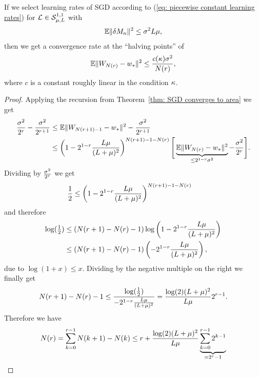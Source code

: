 \begin{theorem}
	If we select learning rates of SGD according to (\ref{eq: piecewise constant
	learning rates}) for \(\mathcal{L}\in\mathcal{S}^{1,1}_{{\mu},{L}}\) with
	\begin{align*}
		\mathbb{E}\|\delta M_n\|^2\le \sigma^2L\mu,
	\end{align*}
	then we get a convergence rate at the ``halving points'' of
	\begin{align*}
		\mathbb{E}\|W_{N(r)} - w_*\|^2 \le \frac{c(\kappa)\sigma^2}{N(r)},
	\end{align*}
	where \(c\) is a constant roughly linear in the condition \(\kappa\).
\end{theorem}
\begin{proof}
	Applying the recursion from Theorem~\ref{thm: SGD converges to area} we get
	\begin{align*}
		\frac{\sigma^2}{2^r} - \frac{\sigma^2}{2^{r+1}}
		&\le\mathbb{E}\|W_{N(r+1)-1} - w_*\|^2 - \frac{\sigma^2}{2^{r+1}}\\
		&\le \left(1-2^{1-r}\frac{L\mu}{(L+\mu)^2}\right)^{N(r+1)-1-N(r)}
		\Bigg[
			\underbrace{\mathbb{E}\|W_{N(r)}-w_*\|^2}_{\le 2^{1-r}\sigma^2} - \frac{\sigma^2}{2^r}
		\Bigg].
	\end{align*}
	Dividing by \(\tfrac{\sigma^2}{2^r}\) we get
	\begin{align*}
		\frac{1}{2}
		&\le \left(1-2^{1-r}\frac{L\mu}{(L+\mu)^2}\right)^{N(r+1)-1-N(r)}
	\end{align*}
	and therefore
	\begin{align*}
		\log(\tfrac12)
		&\le (N(r+1)-N(r)-1)\log\left(1-2^{1-r}\frac{L\mu}{(L+\mu)^2}\right)\\
		&\le (N(r+1)-N(r)-1)\left(-2^{1-r}\frac{L\mu}{(L+\mu)^2}\right),
	\end{align*}
	due to \(\log(1+x)\le x\). Dividing by the negative multiple on the right we
	finally get
	\begin{align*}
		N(r+1)-N(r)-1
		\le \frac{\log(\tfrac12)}{-2^{1-r}\frac{L\mu}{(L+\mu)^2}}
		= \frac{\log(2)(L+\mu)^2}{L\mu}2^{r-1}.
	\end{align*}
	Therefore we have
	\begin{align*}
		N(r) &= \sum_{k=0}^{r-1} N(k+1)-N(k)
		\le r + \frac{\log(2)(\ubound+\lbound)^2}{\ubound\lbound}
		\underbrace{\sum_{k=0}^{r-1} 2^{k-1}}_{=2^r-1}\\

\end{align*}
\end{proof}
